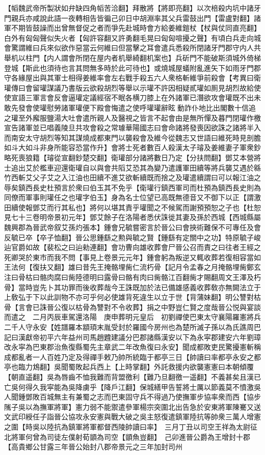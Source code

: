 【幍魏武帝所製狀如弁缺四角幍苦洽翻】拜散將【將即亮翻】以次棓殺内坑中諸牙門親兵亦咸說此語一夜轉相告皆徧己卯日中胡淵率其父兵雷鼓出門【雷盧對翻】諸軍不期皆鼓譟而出曾無督促之者而爭先赴城時會方給姜維鎧杖【杖與仗同直亮翻】白外有匈匈聲似失火者【匈許容翻又許勇翻毛晃曰匈匈喧擾之聲】有頃白兵走向城會驚謂維曰兵來似欲作惡當云何維曰但當擊之耳會遣兵悉殺所閉諸牙門郡守内人共舉机以柱門【内人謂會所閉在屋内者机舉綺翻机案也】兵斫門不能破斯須城外倚梯登城【斯此也須待也言其問無多時於此可待也】或燒城屋蟻附亂進矢下如雨牙門郡守各緣屋出與其軍士相得姜維率會左右戰手殺五六人衆格斬維爭前殺會【考異曰衛瓘傳曰會留瓘謀議乃書版云欲殺胡烈等舉以示瓘不許因相疑貳瓘如厠見胡烈故給使使宣語三軍言會反會逼瓘定議經宿不眠各横刀膝上在外諸軍已潛欲攻會瓘既不出未敢先發會使瓘慰勞諸軍瓘便下殿會悔遣之使呼瓘瓘辭眩動詐仆地比出閣數十信追之瓘至外廨服鹽湯大吐會遣所親人及醫視之皆言不起會由是無所憚及暮門閉瓘作檄宣告諸軍並已唱義陵旦共攻會殺之常璩華陽國志曰會命諸將發喪因欲誅之諸將半入而南安太守胡烈等知其謀燒成都東門以襲殺會及維今從魏志又世語曰維死時見剖膽如斗大如斗非身所能容恐當作升】會將士死者數百人殺漢太子璿及姜維妻子軍衆鈔略死喪狼籍【璿從宣翻鈔楚交翻】衛瓘部分諸將數日乃定【分扶問翻】鄧艾本營將士追出艾於檻車迎還衛瓘自以與會共䧟艾恐其為變乃遣護軍田續等將兵襲艾遇於緜竹西斬艾父子艾之入江油也田續不進艾欲斬續既而捨之及瓘遣續謂曰可以報江油之辱矣鎮西長史杜預言於衆曰伯玉其不免乎【衛瓘行鎮西軍司而杜預為鎮西長史則為同僚而軍事則瓘任之也瓘字伯玉】身為名士位望已高既無德音又不御下以正【謂激田續使報鄧艾而行其私也】將何以堪其責乎瓘聞之不候駕而謝預預恕之子也【杜恕見七十三卷明帝景初元年】鄧艾餘子在洛陽者悉伏誅徙其妻及孫於西城【西城縣屬魏興郡為晉武帝叙艾孫灼張本】鍾會兄毓嘗密言於晉公曰會挾術難保不可專任及會反毓已卒【卒子恤翻】晉公思鍾繇之勲與毓之賢【鍾繇有定關中之功】特原毓子峻辿官爵如故【裴松之曰辿勑連翻】會功曹向雄收葬會尸晉公召而責之曰往者王經之死卿哭於東市而我不問【事見上卷景元元年】鍾會躬為叛逆又輒收葬若復相容當如王法何【復扶又翻】雄曰昔先王掩骼埋胔仁流朽骨【記月令孟春之月掩骼埋胔鄭玄注曰骨枯曰骼肉腐曰胔陸德明曰露骨曰骼有肉曰胔骼江百翻胔才賜翻周文王澤及朽骨】當時豈先卜其功罪而後收葬哉今王誅既加於法已備雄感義收葬敎亦無闕法立于上敎弘于下以此訓物不亦可乎何必使雄背死違生以立于世【背蒲妹翻】明公讐對枯骨【言會已誅晉公復以枯骨為讐對不令收葬】捐之中野豈仁賢之度哉晉公悦與宴談而遣之　二月丙辰車駕還洛陽　庚申葬明元皇后　初劉禪使巴東太守襄陽羅憲將兵二千人守永安【姓譜羅本顓頊末胤受封於羅國今房州也為楚所滅子孫以為氏譙周巴記曰漢獻帝初平六年益州司馬趙韙建議分巴郡諸縣漢安以下為永寜郡建安六年劉璋改永寜為巴東郡治魚復縣蜀先主章武二年改魚復曰永安】聞成都敗吏民驚擾憲斬稱成都亂者一人百姓乃定及得禪手敕乃帥所統臨于都亭三日【帥讀曰率都亭永安之都亭也臨力鴆翻】吳聞蜀敗起兵西上【上時掌翻】外託救援内欲襲憲憲曰本朝傾覆【朝直遥翻】吳為唇齒不恤我難而背盟徼利【難乃旦翻徼一遥翻】不義甚矣且漢已亡吳何得久我寜能為吳降虜乎【降戶江翻】保城繕甲告誓將士厲以節義莫不憤激吳人聞鍾鄧敗百城無主有兼蜀之志而巴東固守兵不得過乃使撫軍步協率衆而西【協步隲子吳以為撫軍將軍】憲力弱不能禦遣參軍楊宗突圍北出告急於安東將軍陳騫又送文武印綬任子詣晉公協攻永安憲與戰大破之吳主怒復遣鎮軍陸抗等帥衆三萬人增憲之圍【時吳以陸抗為鎮軍將軍都督西陵帥讀曰率】　三月丁丑以司空王祥為太尉征北將軍何曾為司徒左僕射荀顗為司空【顗魚豈翻】　己卯進晉公爵為王增封十郡【高貴鄉公甘露三年晉公始封八郡帝景元之三年加封司州